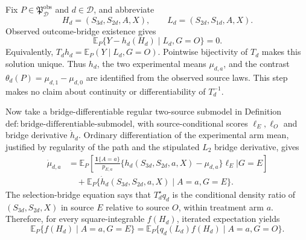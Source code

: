Fix \(P\in\mathfrak P_{\mathcal D}^{\mathrm{obs}}\) and \(d\in\mathcal D\), and abbreviate
\[
 H_d=(S_{3d},S_{2d},A,X),
 \qquad
 L_d=(S_{2d},S_{1d},A,X).
\]
Observed outcome-bridge existence gives
\[
 \mathbb E_P\{Y-h_d(H_d)\mid L_d,G=O\}=0. \tag{1}
\]
Equivalently, \(T_dh_d=\mathbb E_P(Y\mid L_d,G=O)\).  Pointwise bijectivity of \(T_d\) makes this solution unique.  Thus \(h_d\), the two experimental means \(\mu_{d,a}\), and the contrast \(\theta_d(P)=\mu_{d,1}-\mu_{d,0}\) are identified from the observed source laws.  This step makes no claim about continuity or differentiability of \(T_d^{-1}\).

Now take a bridge-differentiable regular two-source submodel in Definition~\(\mathrm{def{:}bridge\text{-}differentiable\text{-}submodel}\), with source-conditional scores \(\ell_E,\ell_O\) and bridge derivative \(\dot h_d\).  Ordinary differentiation of the experimental arm mean, justified by regularity of the path and the stipulated \(L_2\) bridge derivative, gives
\[
\begin{aligned}
 \dot\mu_{d,a}
 &=\mathbb E_P\!\left[
   \frac{\mathbf 1\{A=a\}}{p_{E,a}}
   \{h_d(S_{3d},S_{2d},a,X)-\mu_{d,a}\}\ell_E
   \mathrel{\Big|}G=E\right]\\
 &\quad+\mathbb E_P\{\dot h_d(S_{3d},S_{2d},a,X)\mid A=a,G=E\}.
                                                        \tag{2}
\end{aligned}
\]
The selection-bridge equation says that \(T_d^\star q_d\) is the conditional density ratio of \((S_{3d},S_{2d},X)\) in source \(E\) relative to source \(O\), within treatment arm \(a\).  Therefore, for every square-integrable \(f(H_d)\), iterated expectation yields
\[
 \mathbb E_P\{f(H_d)\mid A=a,G=E\}
 =\mathbb E_P\{q_d(L_d)f(H_d)\mid A=a,G=O\}.             \tag{3}
\]

